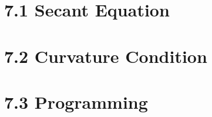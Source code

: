 \documentclass{report}
\begin{document}
	\pagestyle{fancy}
	\hfill \\ \\
	
	\section*{7.1 Secant Equation}
	\section*{7.2 Curvature Condition}
	\section*{7.3 Programming}
\end{document}
